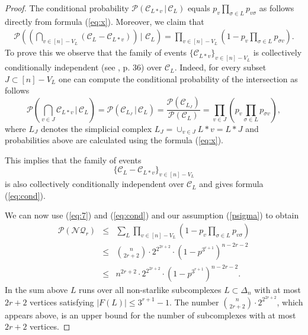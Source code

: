 \documentclass[11pt,twoside, reqno]{amsart}
\theoremstyle{plain}
\theoremstyle{definition}
\begin{document}
\begin{proof}
The conditional probability $\mathcal P(\mathcal C_{L\ast v} \, |\, \mathcal C_L)$ equals 
$
p_v \prod_{\sigma\in L}p_{v\sigma}
$
as follows directly from formula (\ref{eq:x}). 
Moreover, we claim that 
\begin{eqnarray}\label{eq:cond}
\mathcal P\left(\left(\bigcap_{v\in [n]-V_L}(\mathcal C_{L}-\mathcal C_{L\ast v})\right)\, |\, \,  \mathcal C_L\right)= \prod_{v\in [n]-V_L}\left( 1- p_v\prod_{\sigma\in L}p_{\sigma v}\right).
\end{eqnarray}
To prove this we observe that the family of events $\{\mathcal C_{L\ast v}\}_{v\in [n]-V_L}$ is collectively conditionally independent 
(see \cite{Shi}, p. 36) over $\mathcal C_L$. 
Indeed, for every subset $J\subset [n]-V_L$  one can compute
the conditional probability of the intersection as follows
$$
\mathcal P\left(\bigcap_{v\in J}\mathcal C_{L\ast v}\, |\, \mathcal C_L\right)= \mathcal P(\mathcal C_{L_J}\, | \, \mathcal C_L)= \frac{\mathcal P(\mathcal C_{L_J})}{
\mathcal P( \mathcal C_L)}=
\prod_{v\in J}\left( p_v\prod_{\sigma\in L}p_{\sigma v}\right),
$$
where $L_J$ denotes the simplicial complex $L_J=\cup_{v\in J} L\ast v=L\ast J$ and probabilities above are calculated using the formula (\ref{eq:x}). 

This implies that the family of events $$\{\mathcal C_L -\mathcal C_{L\ast v}\}_{v\in [n]-V_L}$$
is also collectively conditionally independent over $\mathcal C_L$ and gives formula (\ref{eq:cond}). 

We can now use (\ref{eq:7}) and (\ref{eq:cond}) and our assumption (\ref{psigma}) to obtain
\begin{eqnarray}\label{eq:9}
\mathcal P(\mathcal {NQ}_r)&\le& \sum_L \prod_{v\in [n]-V_L} (1-p_v\prod_{\sigma\in L}p_{v\sigma})\nonumber\\
&\le & \binom n {2r+2} \cdot 2^{2^{2r+2}}\cdot (1- p^{3^{r+1}})^{n-2r-2}\nonumber\\
&\le & n^{2r+2}\cdot 2^{2^{2r+2}} \cdot 
(1-p^{3^{r+1}})^{n-2r-2}.
\end{eqnarray}
In the sum above $L$ runs over all non-starlike subcomplexes $L\subset \Delta_n$ with at most $2r+2$ vertices satisfying $|F(L)|\le 3^{r+1}-1$. 
The number $\binom{n}{2r+2}\cdot 2^{2^{2r+2}}$, which appears above, is an upper bound for the number of subcomplexes with at most $2r+2$ vertices.



\end{proof}
\end{document}
